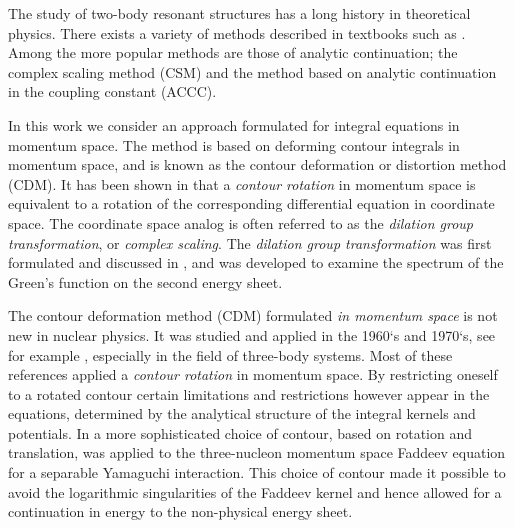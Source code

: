  
The study of two-body resonant structures has a long history in 
theoretical physics. There exists a variety of methods described in  
textbooks such as \cite{newton, kukulin, sitenko, zeldovich}. Among the more popular methods
are those of analytic continuation; 
the complex scaling method (CSM) and the method based on 
analytic continuation in the coupling constant (ACCC).

In this work we consider an approach formulated for integral equations 
in momentum space.  The method is based on 
deforming contour integrals in momentum space, and is known as  
the contour deformation or distortion 
method (CDM). It has been shown in \cite{afnan1} that a \emph{contour rotation} in 
momentum space is equivalent to a rotation of the corresponding differential equation in
coordinate space. The coordinate space analog is often referred to as the 
\emph{dilation group transformation}, or \emph{complex scaling}. The
\emph{dilation group transformation} was first formulated and discussed in 
\cite{abc,abc1}, and was developed to examine the spectrum of the Green's 
function on the second energy sheet. 

The contour deformation method (CDM) formulated \emph{in momentum space} is not new
in nuclear physics. It was studied and applied in the 1960`s  and 1970`s,  
see for example \cite{brayshaw,nuttal,stelbovics,glockle}, especially in the field of 
three-body systems. Most of these references
applied a \emph{contour rotation} in momentum space. By restricting 
oneself to a rotated contour certain limitations and restrictions however appear in the
equations, determined by the analytical structure of the integral kernels and potentials. 
In \cite{glockle} a more sophisticated choice of contour, 
based on rotation and translation, 
was applied to the three-nucleon momentum space Faddeev equation for a separable Yamaguchi interaction.
This choice of contour made it possible to avoid the logarithmic singularities of the Faddeev kernel
and hence allowed for a continuation in energy to the non-physical energy sheet. 

